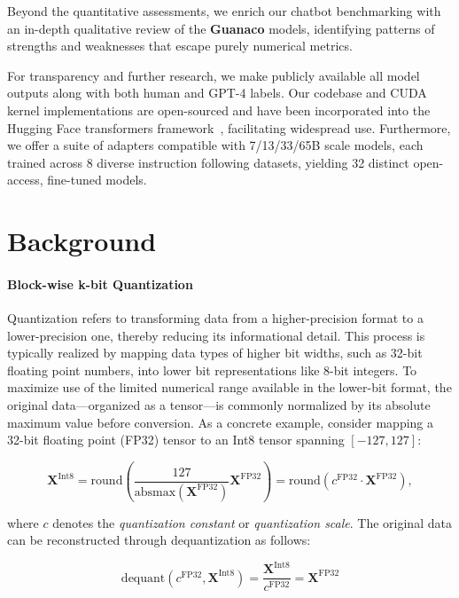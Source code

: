 Beyond the quantitative assessments, we enrich our chatbot benchmarking with an in-depth qualitative review of the \textbf{Guanaco} models, identifying patterns of strengths and weaknesses that escape purely numerical metrics.

For transparency and further research, we make publicly available all model outputs along with both human and GPT-4 labels. Our codebase and CUDA kernel implementations are open-sourced and have been incorporated into the Hugging Face transformers framework~\citep{wolf2019huggingface}, facilitating widespread use. Furthermore, we offer a suite of adapters compatible with 7/13/33/65B scale models, each trained across 8 diverse instruction following datasets, yielding 32 distinct open-access, fine-tuned models.

\section{Background}
\paragraph{Block-wise k-bit Quantization} Quantization refers to transforming data from a higher-precision format to a lower-precision one, thereby reducing its informational detail. This process is typically realized by mapping data types of higher bit widths, such as 32-bit floating point numbers, into lower bit representations like 8-bit integers. To maximize use of the limited numerical range available in the lower-bit format, the original data—organized as a tensor—is commonly normalized by its absolute maximum value before conversion. As a concrete example, consider mapping a 32-bit floating point (FP32) tensor to an Int8 tensor spanning $[-127, 127]$:

\begin{equation}
    \mathbf{X}^{ \text{Int8}} = \text{round}\left( \frac{127}{{\text{absmax}}(\mathbf{X}^{{\text{FP32}}})}\mathbf{X}^{{\text{FP32}}} \right) = \text{round}(c^{\text{FP32}}\cdot \mathbf{X}^{{\text{FP32}}}),
\end{equation}

where $c$ denotes the {\em quantization constant} or {\em quantization scale}. The original data can be reconstructed through dequantization as follows:

\begin{equation}
    \text{dequant}(c^{\text{FP32}}, \mathbf{X}^{\text{Int8}}) = \frac{\mathbf{X}^{\text{Int8}}}{c^{\text{FP32}}} = \mathbf{X}^{\text{FP32}}
\end{equation}

